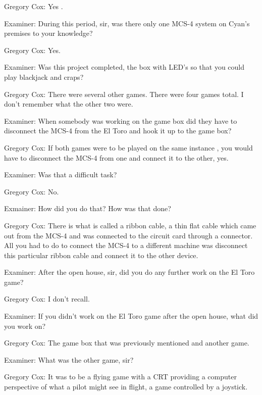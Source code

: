 \textcolor{interviewee}{Gregory Cox:} Yes . 

\textcolor{interviewer}{Examiner:} During this period, sir, was there only one MCS-4 system on Cyan's premises to your knowledge? 

\textcolor{interviewee}{Gregory Cox:} Yes. 

\textcolor{interviewer}{Examiner:} Was this project completed, the box with LED's so that you could play blackjack and craps?

\textcolor{interviewee}{Gregory Cox:} There were several other games. There were four games total. I don't remember what the other two were. 

\textcolor{interviewer}{Examiner:} When somebody was working on the game box did they have to disconnect the MCS-4 from the El Toro and hook it up to the game box? 

\textcolor{interviewee}{Gregory Cox:} If both games were to be played on the same instance , you would have to disconnect the MCS-4 from one and connect it to the other, yes. 

\textcolor{interviewer}{Examiner:} Was that a difficult task? 

\textcolor{interviewee}{Gregory Cox:} No.

Exmainer: How did you do that? How was that done? 

\textcolor{interviewee}{Gregory Cox:} There is what is called a ribbon cable, a thin flat cable which came out from the MCS-4 and was connected to the circuit card through a connector. All you had to do to connect the MCS-4 to a different machine was disconnect this particular ribbon cable and connect it to the other device. 

\textcolor{interviewer}{Examiner:} After the open house, sir, did you do any further work on the El Toro game? 

\textcolor{interviewee}{Gregory Cox:} I don’t recall.

\textcolor{interviewer}{Examiner:} If you didn't work on the El Toro game after the open house, what did you work on?

\textcolor{interviewee}{Gregory Cox:} The game box that was previously mentioned and another game. 

\textcolor{interviewer}{Examiner:} What was the other game, sir? 

\textcolor{interviewee}{Gregory Cox:} It was to be a flying game with a CRT providing a computer perspective of what a pilot might see in flight, a game controlled by a joystick.

